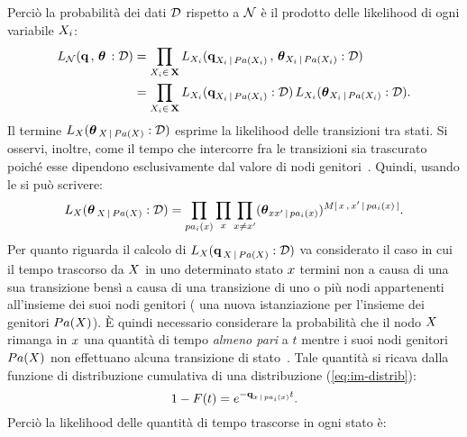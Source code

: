 Perciò la probabilità dei dati $\mathcal{D}$ rispetto a $\mathcal{N}$ è il prodotto delle likelihood di ogni variabile $\mathnormal{X_i}$:
\begin{align}\label{eq:ctbn-likelihood-decomp}
L_{\mathcal{N}}(\boldsymbol{\textbf{\text{q}}}\,,\,\boldsymbol{\textbf{\text{$\theta$}}}\,:\mathcal{D})&=\prod_{\mathnormal{X}_i\in\,\mathbf{X}}L_{\mathnormal{X}_i}(\boldsymbol{\textbf{\text{q}}}_{\mathnormal{X}_i\,\arrowvert\,Pa(\mathnormal{X}_i)}\,,\,\boldsymbol{\textbf{\text{$\theta$}}}_{\mathnormal{X}_i\,\arrowvert\,Pa(\mathnormal{X}_i)}:\mathcal{D}) \nonumber\\
&=\prod_{\mathnormal{X}_i\in\,\mathbf{X}} L_{\mathnormal{X}_i}(\boldsymbol{\textbf{\text{q}}}_{\mathnormal{X}_i\,\arrowvert\,Pa(\mathnormal{X}_i)}:\mathcal{D}) \, L_{\mathnormal{X}_i}(\boldsymbol{\textbf{\text{$\theta$}}}_{\mathnormal{X}_i\,\arrowvert\,Pa(\mathnormal{X}_i)}:\mathcal{D})\text{.}
\end{align}
Il termine $L_{\mathnormal{X}}(\boldsymbol{\textbf{\text{$\theta$}}}_{\,\mathnormal{X}\,\arrowvert\,Pa(\mathnormal{X})}:\mathcal{D})$ esprime la likelihood delle transizioni tra stati. Si osservi, inoltre, come il tempo che intercorre fra le transizioni sia trascurato poiché esse dipendono esclusivamente dal valore di nodi genitori~\citep[si veda][3]{Nodelman2002}. Quindi, usando le \emph{\stats{}} si può scrivere:
\begin{equation}\label{eq:like-transitions}
L_{\setel{X}}(\param{$\theta$}_{\,\setel{X}\,\arrowvert\,Pa(\setel{X})}:\conceptsym{D})=\prod_{pa_i(\setel{x})} \prod_{x} \prod_{x\neq x^{\prime}}(\param{$\theta$}_{xx^{\prime}\,\arrowvert\,pa_i(\setel{x})})^{\mstat[x]{\setel{x}^{\prime}\,\arrowvert\,pa_i(\setel{x})}}\text{.}
\end{equation}
Per quanto riguarda il calcolo di $L_{\mathnormal{X}}(\boldsymbol{\textbf{\text{q}}}_{\,\mathnormal{X}\,\arrowvert\,Pa(\mathnormal{X})}:\mathcal{D})$ va considerato il caso in cui il tempo trascorso da $\mathnormal{X}$ in uno determinato stato $\mathnormal{x}$ termini non a causa di una sua transizione bensì a causa di una transizione di uno o più nodi appartenenti all'insieme dei suoi nodi genitori (\ie{} una nuova istanziazione per l'insieme dei genitori $Pa(\mathnormal{X})$). \`E quindi necessario considerare la probabilità che il nodo $\mathnormal{X}$ rimanga in $\mathnormal{x}$ una quantità di tempo \emph{almeno pari} a $t$ mentre i suoi nodi genitori $Pa(\mathnormal{X})$ non effettuano alcuna transizione di stato~\citep[si veda][3]{Nodelman2002}. Tale quantità si ricava dalla funzione di distribuzione cumulativa di una distribuzione  (\autoref{eq:im-distrib}):
\[
1-F(t)=e^{-\boldsymbol{\textbf{\text{q}}}_{\mathnormal{x}\,\arrowvert\,pa_i(\mathnormal{x})}t}\text{.}
\]
Perciò la likelihood delle quantità di tempo trascorse in ogni stato è:
